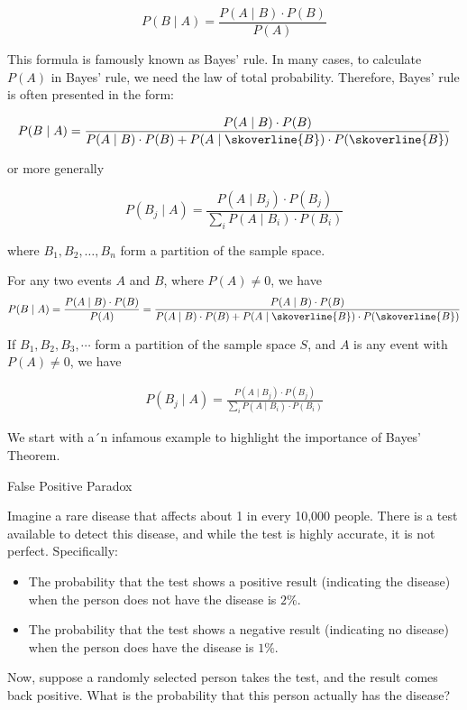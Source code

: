 \[
P(B \mid A) = \frac{P(A \mid B) \cdot P(B)}{P(A)}
\]

This formula is famously known as Bayes' rule. In many cases, to calculate \( P(A) \) in Bayes' rule, we need the law of total probability. Therefore, Bayes' rule is often presented in the form:

\[
P(B \mid A) = \frac{P(A \mid B) \cdot P(B)}{P(A \mid B) \cdot P(B) + P(A \mid \skoverline{B}) \cdot P(\skoverline{B})}
\]

or more generally

\[
P\left(B_j \mid A\right) = \frac{P\left(A \mid B_j\right) \cdot P\left(B_j\right)}{\sum_i P\left(A \mid B_i\right) \cdot P\left(B_i\right)}
\]

where \( B_1, B_2, \ldots, B_n \) form a partition of the sample space.

\begin{theorem}
    For any two events $A$ and $B$, where $P(A) \neq 0$, we have
    \begin{align*}
    P(B \mid A) = \frac{P(A \mid B) \cdot P(B)}{P(A)}
     = \frac{P(A \mid B) \cdot P(B)}{P(A \mid B) \cdot P(B) + P(A \mid \skoverline{B}) \cdot P(\skoverline{B})}
    \end{align*}

    If $B_1, B_2, B_3, \cdots$ form a partition of the sample space $S$, and $A$ is any event with $P(A) \neq 0$, we have

    \begin{align*}
    P\left(B_j \mid A\right) = \frac{P\left(A \mid B_j\right) \cdot P\left(B_j\right)}{\sum_i P\left(A \mid B_i\right) \cdot P\left(B_i\right)}
    \end{align*}
\end{theorem}

We start with a´n infamous example to highlight the importance of Bayes' Theorem.

\begin{example} False Positive Paradox

   Imagine a rare disease that affects about 1 in every 10,000 people. There is a test available to detect this disease, and while the test is highly accurate, it is not perfect. Specifically:
\begin{itemize}
    \item The probability that the test shows a positive result (indicating the disease) when the person does not have the disease is $2 \%$.
    \item The probability that the test shows a negative result (indicating no disease) when the person does have the disease is $1 \%$.
\end{itemize}

Now, suppose a randomly selected person takes the test, and the result comes back positive. What is the probability that this person actually has the disease?
\end{example}

